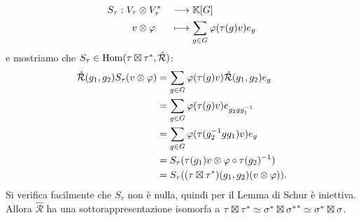 \begin{example}
\begin{alignat*}{2}
S_\tau:V_\tau&\otimes V_\tau^*&&\longrightarrow\mathbb{K}[G]\\
v&\otimes\varphi&&\longmapsto\sum_{g\in G}\varphi(\tau(g)v)e_g
\end{alignat*}
e mostriamo che $S_\tau\in\operatorname{Hom}(\tau\boxtimes\tau^*,\hat{\mathcal{R}})$:
\begin{align*}
\hat{\mathcal{R}}(g_1,g_2)S_\tau(v\otimes\varphi)&=\sum_{g\in G}\varphi(\tau(g)v)\hat{\mathcal{R}}(g_1,g_2)e_g\\
&=\sum_{g\in G}\varphi(\tau(g)v)e_{g_2gg_1^{-1}}\\
&=\sum_{g\in G}\varphi(\tau(g_2^{-1}gg_1)v)e_g\\
&=S_\tau(\tau(g_1)v\otimes\varphi\circ\tau(g_2)^{-1})\\
&=S_\tau((\tau\boxtimes\tau^*)(g_1,g_2)(v\otimes\varphi)).
\end{align*}
Si verifica facilmente che $S_\tau$ non è nulla, quindi per il Lemma di Schur è iniettiva. Allora $\hat{\mathcal{R}}$ ha una sottorappresentazione isomorfa a $\tau\boxtimes\tau^*\simeq\sigma^*\boxtimes{\sigma^*}^*\simeq\sigma^*\boxtimes\sigma$.
\end{example}
